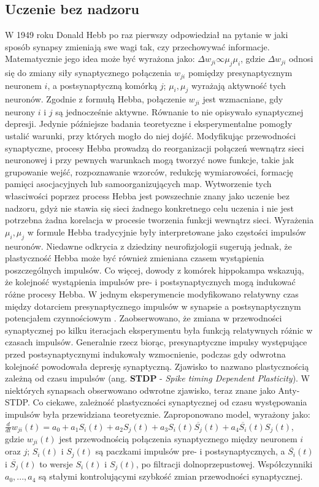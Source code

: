 \subsection{Uczenie bez nadzoru}
W 1949 roku Donald Hebb po raz pierwszy odpowiedział na pytanie w jaki sposób synapsy zmieniają swe wagi tak, czy przechowywać informacje. Matematycznie jego idea może być wyrażona jako: $\Delta w_{ji} \infty \mu_j \mu_i$, gdzie $\Delta w_{ji}$ odnosi się do zmiany siły synaptycznego połączenia $w_{ji}$ pomiędzy presynaptycznym neuronem $i$, a postsynaptyczną komórką $j$; $\mu_i, \mu_j$ wyrażają aktywność tych neuronów. Zgodnie z formułą Hebba, połączenie $w_{ji}$ jest wzmacniane, gdy neurony $i$ i $j$ są jednocześnie aktywne. Równanie to nie opisywało synaptycznej depresji. Jedynie późniejsze badania teoretyczne i eksperymentalne pomogły ustalić warunki, przy których mogło do niej dojść.
Modyfikując przewodności synaptyczne, procesy Hebba prowadzą do reorganizacji połączeń wewnątrz sieci neuronowej i przy pewnych warunkach mogą tworzyć nowe funkcje, takie jak grupowanie wejść, rozpoznawanie wzorców, redukcję wymiarowości, formację pamięci asocjacyjnych lub samoorganizujących map. Wytworzenie tych własciwości poprzez process Hebba jest powszechnie znany jako uczenie bez nadzoru, gdyż nie stawia się sieci żadnego konkretnego celu uczenia i nie jest potrzebna żadna korelacja w procesie tworzenia funkcji wewnątrz sieci. 
Wyrażenia $\mu_i, \mu_j$ w formule Hebba tradycyjnie były interpretowane jako częstości impulsów neuronów. Niedawne odkrycia z dziedziny neurofizjologii sugerują jednak, że plastyczność Hebba może być również zmieniana czasem wystąpienia poszczególnych impulsów. Co więcej, dowody z komórek hippokampa wskazują, że kolejność wystąpienia impulsów pre- i postsynaptycznych mogą indukować różne procesy Hebba. W jednym eksperymencie modyfikowano relatywny czas między dotarciem presynaptycznego impulsów w synapsie a postsynaptycznym potencjałem czynnościowym \cite{Markram97}. Zaobserwowano, że zmiana w przewodności synaptycznej po kilku iteracjach eksperymentu była funkcją relatywnych różnic w czasach impulsów. Generalnie rzecz biorąc, presynaptyczne impulsy występujące przed postsynaptycznymi indukowały wzmocnienie, podczas gdy odwrotna kolejność powodowała depresję synaptyczną. Zjawisko to nazwano plastycznością zależną od czasu impulsów (ang. \textbf{STDP} - \textit{Spike timing Dependent Plasticity}). W niektórych synapsach obserwowano odwrotne zjawisko, teraz znane jako Anty-STDP.
Co ciekawe, zależność plastyczności synaptycznej od czasu występowania impulsów była przewidziana teoretycznie. Zaproponowano model, wyrażony jako: $\frac{d}{dt} w_{ji}(t) = a_0 + a_1 S_i(t) + a_2 S_j(t) + a_3 S_i(t) \overline{S_j}(t) + a_4 \overline{S_i}(t)S_j(t)$, gdzie $w_{ji}(t)$ jest przewodnością połączenia synaptycznego między neuronem $i$ oraz $j$; $S_i(t)$ i $S_j(t)$ są paczkami impulsów pre- i postsynaptycznych, a $\overline{S_i}(t)$ i $\overline{S_j}(t)$ to wersje $S_i(t)$ i $S_j(t)$, po filtracji dolnoprzepustowej. Współczynniki $a_0,...,a_4$ są stałymi kontrolującymi szybkość zmian przewodności synaptycznej. 
